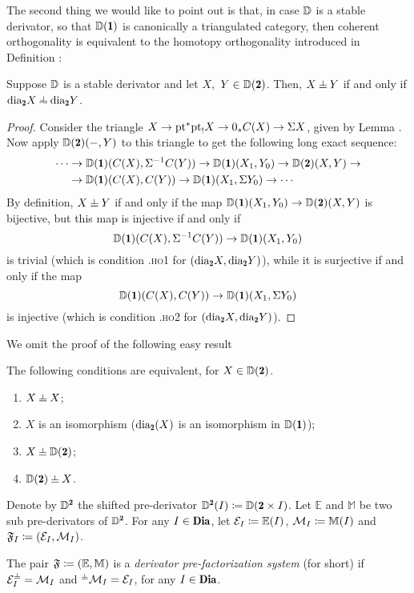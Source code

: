 The second thing we would like to point out is that, in case $\mathbb{D}$ is a stable derivator, so that $\D(\uno)$ is canonically a triangulated category,
then coherent orthogonality is equivalent to the homotopy orthogonality introduced in Definition :
\begin{lemma}\label{coherent_orth_is_wobbly}
Suppose $\mathbb{D}$ is a stable derivator and let $X,$ $Y\in \D(\due)$. Then, $X\corth Y$ if and only if $\dia_{\due}X\horth \dia_{\due}Y$.
\end{lemma}
\begin{proof}
Consider the triangle $X\to \text{pt}^*\text{pt}_!X\to 0_*C(X)\to \Sigma X$,  given by Lemma . Now apply $\D(\due)(-,Y)$ to this triangle to get the following long exact sequence:
\begin{align*}
\label{ort_ses}
\cdots &\to \D(\uno)(C(X),\Sigma^{-1}C(Y))\to \D(\uno)(X_1,Y_0)\to \D(\due)(X,Y)\to \\
\notag &\to\D(\uno)(C(X),C(Y))\to \D(\uno)(X_1,\Sigma Y_0)\to\cdots 
\end{align*}
By definition, $X\corth Y$ if and only if the map $\D(\uno)(X_1,Y_0)\to \D(\due)(X,Y)$ is bijective, but this map is injective if and only if  
\[
\D(\uno)(C(X),\Sigma^{-1}C(Y))\to \D(\uno)(X_1,Y_0)
\] 
is trivial (which is condition .\textsc{ho}1 for $(\dia_{\due}X,\dia_{\due}Y)$), while it is surjective if and only if the map 
\[
\D(\uno)(C(X),C(Y))\to \D(\uno)(X_1,\Sigma Y_0)
\] 
is injective (which is condition .\textsc{ho}2 for $(\dia_{\due}X,\dia_{\due}Y)$).
\end{proof}

We omit the proof of the following easy result

\begin{proposition}\label{ortho_to_self}
The following conditions are equivalent, for $X\in\D(\due)$.
\begin{enumerate}
	\item $X\corth X$;
	\item $X$ is an isomorphism (\ie $\dia_\due(X)$ is an isomorphism in $\D(\uno)$);%
	\item $X\corth \D(\due)$;
	\item $\D(\due)\corth X$.
\end{enumerate}
\end{proposition}


\begin{definition}\label{def_phfs}
Denote by $\D^{\due}$ the shifted pre-derivator $\D^{\due}(I) \coloneqq \D(\due\times I)$. 
Let $\mathbb E$ and $\mathbb M$ be two sub pre-derivators of $\D^{\due}$.
For any $I\in \Dia$, let $\mathcal{E}_I \coloneqq \mathbb E(I)$, $\mathcal{M}_I \coloneqq \mathbb M(I)$ and $\mathfrak{F}_I \coloneqq (\mathcal{E}_I,\mathcal{M}_I)$.%

The pair $\mathfrak{F} \coloneqq (\mathbb E,\mathbb M)$ is a \emph{derivator pre-factorization system} (\cpfs for short) if $\E_I^{\corth}=\M_I$ and ${}^{\corth }\M_I=\E_I$,  for any $I\in\Dia$.
\end{definition}

